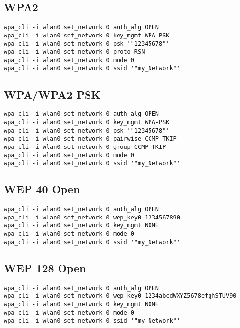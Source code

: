 \newpage
\subsection{WPA2}
\begin{lstlisting}[style=text]
wpa_cli -i wlan0 set_network 0 auth_alg OPEN
wpa_cli -i wlan0 set_network 0 key_mgmt WPA-PSK
wpa_cli -i wlan0 set_network 0 psk '"12345678"'
wpa_cli -i wlan0 set_network 0 proto RSN
wpa_cli -i wlan0 set_network 0 mode 0
wpa_cli -i wlan0 set_network 0 ssid '"my_Network"'
\end{lstlisting}

\subsection{WPA/WPA2 PSK}
\begin{lstlisting}[style=text]
wpa_cli -i wlan0 set_network 0 auth_alg OPEN
wpa_cli -i wlan0 set_network 0 key_mgmt WPA-PSK
wpa_cli -i wlan0 set_network 0 psk '"12345678"'
wpa_cli -i wlan0 set_network 0 pairwise CCMP TKIP
wpa_cli -i wlan0 set_network 0 group CCMP TKIP
wpa_cli -i wlan0 set_network 0 mode 0
wpa_cli -i wlan0 set_network 0 ssid '"my_Network"'
\end{lstlisting}

\subsection{WEP 40 Open}
\begin{lstlisting}[style=text]
wpa_cli -i wlan0 set_network 0 auth_alg OPEN
wpa_cli -i wlan0 set_network 0 wep_key0 1234567890
wpa_cli -i wlan0 set_network 0 key_mgmt NONE
wpa_cli -i wlan0 set_network 0 mode 0
wpa_cli -i wlan0 set_network 0 ssid '"my_Network"'
\end{lstlisting}

\subsection{WEP 128 Open}
\begin{lstlisting}[style=text]
wpa_cli -i wlan0 set_network 0 auth_alg OPEN
wpa_cli -i wlan0 set_network 0 wep_key0 1234abcdWXYZ5678efghSTUV90
wpa_cli -i wlan0 set_network 0 key_mgmt NONE
wpa_cli -i wlan0 set_network 0 mode 0
wpa_cli -i wlan0 set_network 0 ssid '"my_Network"'
\end{lstlisting}

\newpage
